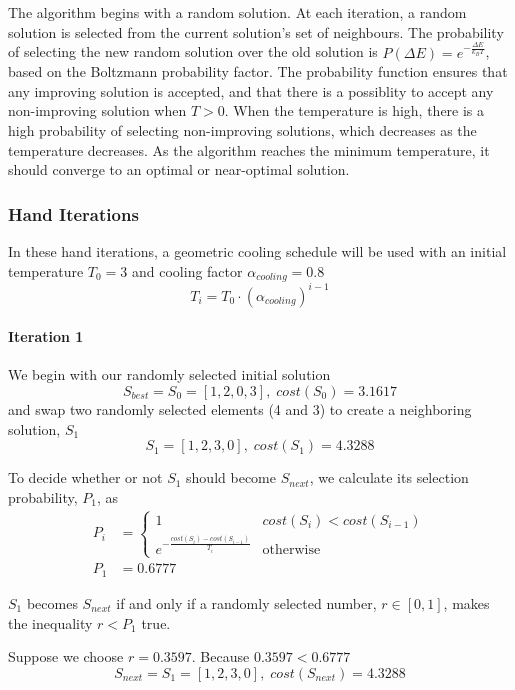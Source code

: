 \documentclass[a4paper]{article}
\newcommand{\subsubsubsection}[1]{\paragraph{#1} \mbox{}}
\begin{document}
The algorithm begins with a random solution. At each iteration, a random solution is selected from the current solution's set of neighbours. The probability of selecting the new random solution over the old solution is $\mathit{P}(\Delta{}E) = e^{-\frac{\Delta{}E}{k_{B}T}}$, based on the Boltzmann probability factor.\cite{Kirkpatrick} The probability function ensures that any improving solution is accepted, and that there is a possiblity to accept any non-improving solution when $T>0$. When the temperature is high, there is a high probability of selecting non-improving solutions, which decreases as the temperature decreases. As the algorithm reaches the minimum temperature, it should converge to an optimal or near-optimal solution.

\subsubsection{Hand Iterations}

In these hand iterations, a geometric cooling schedule will be used with an initial temperature $T_0 = 3$ and cooling factor $\alpha_\mathit{cooling} = 0.8$
$$T_i = T_0 \cdot \left( \alpha_\mathit{cooling} \right)^{i - 1}$$

\subsubsubsection{Iteration 1}

We begin with our randomly selected initial solution
$$S_\mathit{best} = S_0 = [ 1, 2, 0, 3 ], \; \mathit{cost}(S_0) = 3.1617$$
and swap two randomly selected elements (4 and 3) to create a neighboring
solution, $S_1$
$$S_1 = [ 1, 2, 3, 0 ], \; \mathit{cost}(S_1) = 4.3288$$

To decide whether or not $S_1$ should become $S_\mathit{next}$, we calculate its
selection probability, $P_1$, as
\begin{align*}
P_i & =
\begin{cases}
  1 & \mathit{cost}(S_{i}) < \mathit{cost}(S_{i - 1}) \\
  e^{-\frac{\mathit{cost}(S_{i}) - \mathit{cost}(S_{i - 1})}{T_i}} & \text{otherwise}
\end{cases} \\
P_1 & = 0.6777
\end{align*}

$S_1$ becomes $S_\mathit{next}$ if and only if a randomly selected number,
$r \in [0, 1]$, makes the inequality $r < P_1$ true.

Suppose we choose $r = 0.3597$. Because $0.3597 < 0.6777$
$$S_\mathit{next} = S_1 = [ 1, 2, 3, 0 ], \; \mathit{cost}(S_\mathit{next}) = 4.3288$$
\end{document}
